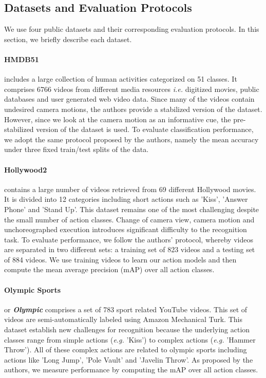 \documentclass[runningheads]{llncs}
\begin{document}
\subsection{Datasets and Evaluation Protocols}
\label{subsec:datasets}
We use four public datasets \cite{kuehne2011, marszalek2009, niebles2010, reddy2013} and their corresponding evaluation protocols. In this section, we briefly describe each dataset.

\paragraph{HMDB51} \cite{kuehne2011} includes a large collection of human activities categorized on 51 classes. It comprises 6766 videos from different media resources \emph{i.e.} digitized movies, public databases and user generated web video data. Since many of the videos contain undesired camera motions, the authors provide a stabilized version of the dataset. However, since we look at the camera motion as an informative cue, the pre-stabilized version of the dataset is used. To evaluate classification performance, we adopt the same protocol proposed by the authors, namely the mean accuracy under three fixed train/test splits of the data.

\paragraph{Hollywood2} \cite{marszalek2009} contains a large number of videos retrieved from 69 different Hollywood movies. It is divided into 12 categories including short actions such as 'Kiss', 'Answer Phone' and 'Stand Up'. This dataset remains one of the most challenging despite the small number of action classes. Change of camera view,  camera motion and unchoreographed execution introduces significant difficulty to the recognition task. To evaluate performance, we follow the authors' protocol, whereby videos are separated in two different sets: a training set of 823 videos and a testing set of 884 videos. We use training videos to learn our action models and then compute the mean average precision (mAP) over all action classes.

\paragraph{Olympic Sports} \cite{niebles2010} or \textbf\textit{{Olympic}} comprises a set of 783 sport related YouTube videos. This set of videos are semi-automatically labeled using Amazon Mechanical Turk. This dataset establish new challenges for recognition because the underlying action classes range from simple actions (\emph{e.g.} 'Kiss') to complex actions (\emph{e.g.} 'Hammer Throw'). All of these complex actions are related to olympic sports including actions like 'Long Jump', 'Pole Vault' and 'Javelin Throw'. As proposed by the authors, we measure performance by computing the mAP over all action classes.
\end{document}
